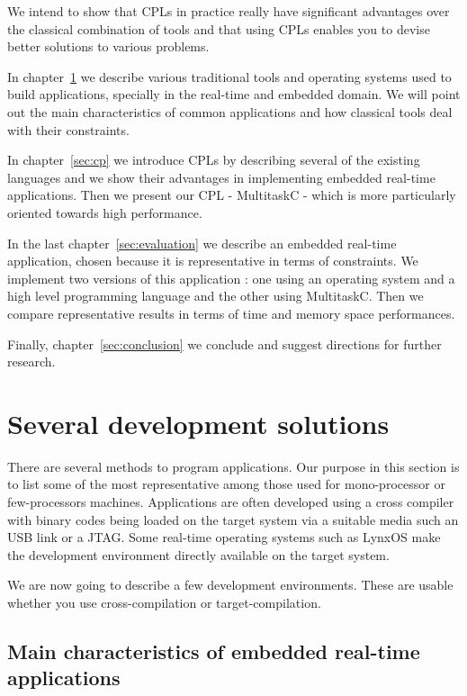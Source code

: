 \documentclass[10pt]{report}
\begin{document}
We intend to show that CPLs in practice really have significant
advantages over the classical combination of tools and that using
CPLs enables you to devise better solutions to various problems.

In chapter~\ref{sec:related} we describe various traditional tools
and operating systems used to build applications, specially in
the real-time and embedded domain. We will point out the main
characteristics of common applications and how classical tools
deal with their constraints.

In chapter~\ref{sec:cp} we introduce CPLs by describing several of
the existing languages and we show their advantages in
implementing embedded real-time applications. Then we present our
CPL - MultitaskC - which is more particularly oriented towards
high performance.

In the last chapter~\ref{sec:evaluation} we describe an embedded
real-time application, chosen because it is representative in
terms of constraints. We implement two versions of this
application : one using an operating system and a
high level programming language and the other using MultitaskC.
Then we compare representative results in terms of time and
memory space performances.

Finally, chapter~\ref{sec:conclusion} we conclude and suggest
directions for further research.

\chapter{Several development solutions}
\label{sec:related}

There are several methods to program applications. Our purpose in
this section is to list some of the most representative among
those used for mono-processor or few-processors machines.
Applications are often developed using a cross compiler with
binary codes being loaded on the target system via a suitable
media such an USB link or a JTAG. Some real-time operating
systems such as LynxOS make the development environment directly
available on the target system.

We are now going to describe a few development environments.
These are usable whether you use cross-compilation or
target-compilation.

\section{Main characteristics of embedded real-time applications}
\end{document}
